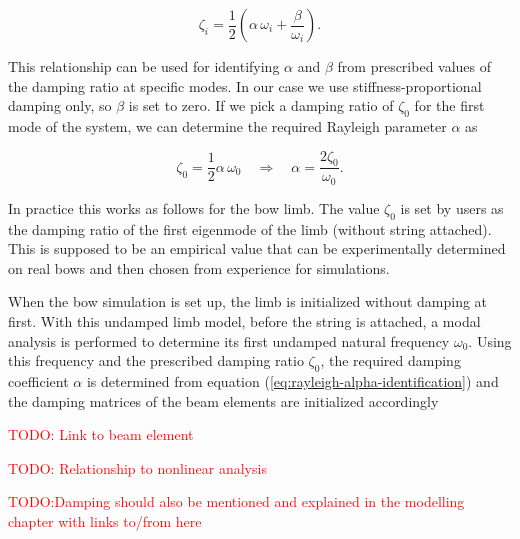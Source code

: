 \begin{equation}
\zeta_{i} = \frac{1}{2}\left(\alpha\,\omega_{i} + \frac{\beta}{\omega_{i}}\right).
\end{equation}

This relationship can be used for identifying $\alpha$ and $\beta$ from prescribed values of the damping ratio at specific modes.
In our case we use stiffness-proportional damping only, so $\beta$ is set to zero.
If we pick a damping ratio of $\zeta_{0}$ for the first mode of the system, we can determine the required Rayleigh parameter $\alpha$ as

\begin{equation}
\zeta_{0} = \frac{1}{2}\alpha\,\omega_{0} \quad \Rightarrow \quad \alpha = \frac{2\zeta_{0}}{\omega_{0}}. \label{eq:rayleigh-alpha-identification}
\end{equation}

In practice this works as follows for the bow limb.
The value $\zeta_{0}$ is set by users as the damping ratio of the first eigenmode of the limb (without string attached).
This is supposed to be an empirical value that can be experimentally determined on real bows and then chosen from experience for simulations.

When the bow simulation is set up, the limb is initialized without damping at first.
With this undamped limb model, before the string is attached, a modal analysis is performed to determine its first undamped natural frequency $\omega_{0}$.
Using this frequency and the prescribed damping ratio $\zeta_{0}$, the required damping coefficient $\alpha$ is determined from equation (\ref{eq:rayleigh-alpha-identification}) and the damping matrices of the beam elements are initialized accordingly

\textcolor{red}{TODO: Link to beam element}

\textcolor{red}{TODO: Relationship to nonlinear analysis}

\textcolor{red}{TODO:Damping should also be mentioned and explained in the modelling chapter with links to/from here}
